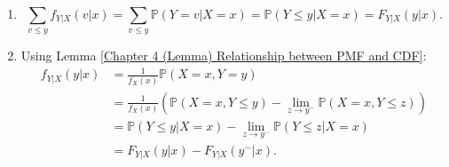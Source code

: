 \documentclass{huhtakm-template-book-v2}
\newcommand{\prob}{\mathbb{P}}
\begin{document}
    \begin{proofing}
        \begin{enumerate}
            \item 
            \begin{equation*}
                \sum_{v \leq y}f_{Y|X}(v|x) = \sum_{v \leq y}\prob(Y = v|X = x) = \prob(Y \leq y|X = x) = F_{Y|X}(y|x).
            \end{equation*}
            \item 
            Using Lemma \ref{Chapter 4 (Lemma) Relationship between PMF and CDF}:
            \begin{align*}
                f_{Y|X}(y|x) &= \frac{1}{f_{X}(x)}\prob(X = x,Y = y)\\
                &= \frac{1}{f_{X}(x)}\left(\prob(X = x,Y \leq y)-\lim_{z \to y^{-}}\prob(X = x,Y \leq z)\right)\\
                &= \prob(Y \leq y|X = x)-\lim_{z \to y^{-}}\prob(Y \leq z|X = x)\\
                &= F_{Y|X}(y|x)-F_{Y|X}(y^{-}|x).
            \end{align*}
        \end{enumerate}
    \end{proofing}
    \newpage
\end{document}
